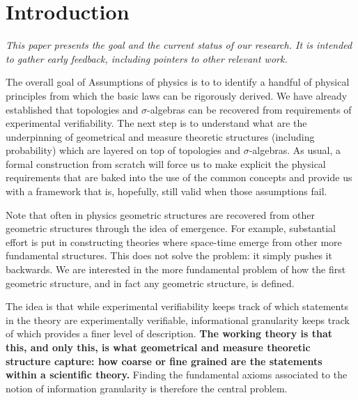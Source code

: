 \documentclass[11pt]{article}
\begin{document}
\def\eqgran{\doteq}
\def\finer{\leqdot}
\def\nfiner{\nleqdot}
\def\coarser{\geqdot}
\def\ncoarser{\ngeqdot}
\def\sfiner{\lessdot}
\def\scoarser{\gtrdot}

\section{Introduction}

\emph{This paper presents the goal and the current status of our research. It is intended to gather early feedback, including pointers to other relevant work.}

The overall goal of Assumptions of physics is to to identify a handful of physical principles from which the basic laws can be rigorously derived. We have already established that topologies and $\sigma$-algebras can be recovered from requirements of experimental verifiability.\cite{AoPBook,AoPOverviewVerifiability} The next step is to understand what are the underpinning of geometrical and measure theoretic structures (including probability) which are layered on top of topologies and $\sigma$-algebras. As usual, a formal construction from scratch will force us to make explicit the physical requirements that are baked into the use of the common concepts and provide us with a framework that is, hopefully, still valid when those assumptions fail.

Note that often in physics geometric structures are recovered from other geometric structures through the idea of emergence. For example, substantial effort is put in constructing theories where space-time emerge from other more fundamental structures. This does not solve the problem: it simply pushes it backwards. We are interested in the more fundamental problem of how the first geometric structure, and in fact any geometric structure, is defined.

The idea is that while experimental verifiability keeps track of which statements in the theory are experimentally verifiable, informational granularity keeps track of which provides a finer level of description. \textbf{The working theory is that this, and only this, is what geometrical and measure theoretic structure capture: how coarse or fine grained are the statements within a scientific theory.} Finding the fundamental axioms associated to the notion of information granularity is therefore the central problem.

\end{document}
